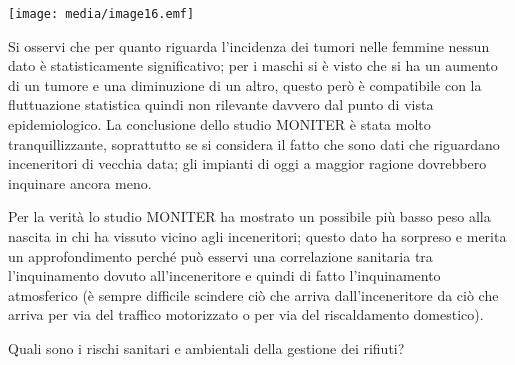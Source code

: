\documentclass[]{article}
\begin{document}
\texttt{[image: media/image16.emf]}

Si osservi che per quanto riguarda l'incidenza dei tumori nelle femmine
nessun dato è statisticamente significativo; per i maschi si è visto che
si ha un aumento di un tumore e una diminuzione di un altro, questo però
è compatibile con la fluttuazione statistica quindi non rilevante
davvero dal punto di vista epidemiologico. La conclusione dello studio
MONITER è stata molto tranquillizzante, soprattutto se si considera il
fatto che sono dati che riguardano inceneritori di vecchia data; gli
impianti di oggi a maggior ragione dovrebbero inquinare ancora meno.

Per la verità lo studio MONITER ha mostrato un possibile più basso peso
alla nascita in chi ha vissuto vicino agli inceneritori; questo dato ha
sorpreso e merita un approfondimento perché può esservi una correlazione
sanitaria tra l'inquinamento dovuto all'inceneritore e quindi di fatto
l'inquinamento atmosferico (è sempre difficile scindere ciò che arriva
dall'inceneritore da ciò che arriva per via del traffico motorizzato o
per via del riscaldamento domestico).

Quali sono i rischi sanitari e ambientali della gestione dei rifiuti?
\end{document}

